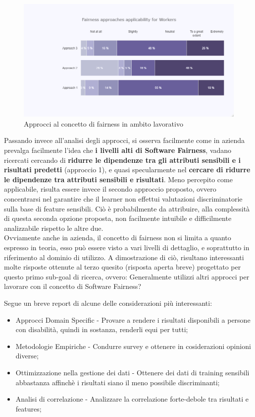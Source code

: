       \begin{figure}[h!]
        \centering
        \includegraphics[width=1\textwidth]{figure/Analisi/RQ1/Hist_Fairness_Approaches_Applicability.png}
        \caption{Approcci al concetto di fairness in ambito lavorativo}
    \end{figure}
    
    Passando invece all'analisi degli approcci, si osserva facilmente come in azienda prevalga facilmente l'idea che \textbf{i livelli alti di Software Fairness}, vadano ricercati cercando di \textbf{ridurre le dipendenze tra gli attributi sensibili e i risultati predetti} (approccio 1), e quasi specularmente nel \textbf{cercare di ridurre le dipendenze tra attributi sensibili e risultati}. Meno percepito come applicabile, risulta essere invece il secondo approccio proposto, ovvero concentrarsi nel garantire che il learner non effettui valutazioni discriminatorie sulla base di feature sensibili. Ciò è probabilmente da attribuire, alla complessità di questa seconda opzione proposta, non facilmente intuibile e difficilmente analizzabile rispetto le altre due.\\
    
    Ovviamente anche in azienda, il concetto di fairness non si limita a quanto espresso in teoria, esso può essere visto a vari livelli di dettaglio, e soprattutto in riferimento al dominio di utilizzo. A dimostrazione di ciò, risultano interessanti molte risposte ottenute al terzo quesito (risposta aperta breve) progettato per questo primo sub-goal di ricerca, ovvero: Generalmente utilizzi altri approcci per lavorare con il concetto di Software Fairness?
	
	Segue un breve report di alcune delle considerazioni più interessanti:
	
	\begin{itemize}
	    \item Approcci Domain Specific - Provare a rendere i risultati disponibili a persone con disabilità, quindi in sostanza, renderli equi per tutti; 
	    \item Metodologie Empiriche - Condurre survey e ottenere in cosiderazioni opinioni diverse;
	    \item Ottimizzazione nella gestione dei dati - Ottenere dei dati di training sensibili abbastanza affinchè i risultati siano il meno possibile discriminanti;
	    \item Analisi di correlazione - Analizzare la correlazione forte-debole tra risultati e features;
	\end{itemize}
    
